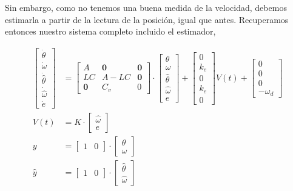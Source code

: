 \documentclass[10pt,a4paper]{report}
\begin{document}
Sin embargo, como no tenemos una buena medida de la velocidad, debemos estimarla a partir de la lectura de la posición, igual que antes. Recuperamos entonces nuestro sistema completo incluido el estimador,

\begin{align}
\begin{bmatrix}
\dot{\theta}\\
\dot{\omega}\\
\dot{\hat{\theta}}\\
\dot{\hat{\omega}}\\
\dot{e}
\end{bmatrix} &= \begin{bmatrix}
A & \mathbf{0} & \mathbf{0}\\
LC & A-LC & \mathbf{0}\\
\mathbf{0} & C_v & 0
\end{bmatrix}\cdot\begin{bmatrix}
\theta\\
\omega\\
\hat{\theta}\\
\hat{\omega}\\
e 
\end{bmatrix}+\begin{bmatrix}
0\\
k_e\\
0\\
k_e\\
0
\end{bmatrix}V(t)+ \begin{bmatrix}
0\\
0\\
0\\
-\omega_d
\end{bmatrix}\\ \label{eq519}
V(t) &= K\cdot\begin{bmatrix}
\hat{\omega}\\
e
\end{bmatrix}\\
y &= \begin{bmatrix}
1& 0
\end{bmatrix}\cdot\begin{bmatrix}
\theta\\
\omega
\end{bmatrix}\\
\hat{y} &= \begin{bmatrix}
1& 0
\end{bmatrix}\cdot\begin{bmatrix}
\hat{\theta}\\
\hat{\omega}
\end{bmatrix} \label{eq522}
\end{align}
\end{document}
